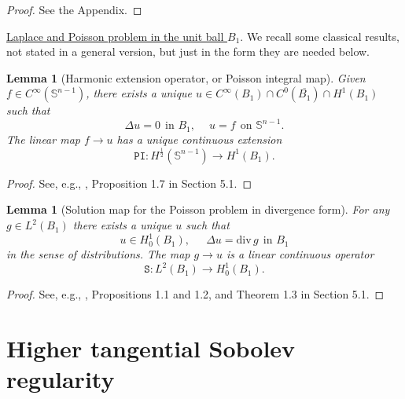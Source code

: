\documentclass[10pt,reqno,a4paper]{article}
\numberwithin{equation}{section}
\theoremstyle{plain}
\newtheorem{lemma}[theorem]{Lemma}
\theoremstyle{definition}
\renewcommand{\S}{{\mathbb S}}
\renewcommand{\div}{\mathrm{div}\,}
\begin{document}
\begin{proof}
See the Appendix.
\end{proof}




\medskip

\underline{Laplace and Poisson problem in the unit ball $B_1$}. 
We recall some classical results, not stated in a general version, 
but just in the form they are needed below. 

\begin{lemma}[Harmonic extension operator, or Poisson integral map] 
\label{lemma:def.harmonic.ext.op} 
Given $f \in C^\infty(\S^{n-1})$, there exists a unique 
$u \in C^\infty(B_1) \cap C^0(\overline{B_1}) \cap H^1(B_1)$ 
such that 
\[
\Delta u = 0 \ \  \text{in } B_1, \quad \ 
u = f \ \  \text{on } \S^{n-1}.
\]
The linear map $f \to u$ has a unique continuous extension 
\[
\mathtt{PI} : H^{\frac12}(\S^{n-1}) \to H^1(B_1).
\]
\end{lemma}

\begin{proof} 
See, e.g., \cite{Taylor.volume.1}, Proposition 1.7 in Section 5.1. 
\end{proof}


\begin{lemma}[Solution map for the Poisson problem in divergence form] 
\label{lemma:op.S}
For any $g \in L^2(B_1)$ there exists a unique $u$ such that 
\[
u \in H^1_0(B_1), \quad \ \  
\Delta u = \div g \ \  \text{in } B_1
\]
in the sense of distributions. 
The map $g \to u$ is a linear continuous operator 
\[
\mathtt S : L^2(B_1) \to H^1_0(B_1).
\]
\end{lemma}

\begin{proof} 
See, e.g., \cite{Taylor.volume.1}, 
Propositions 1.1 and 1.2, and Theorem 1.3 in Section 5.1. 
\end{proof}






\section{Higher tangential Sobolev regularity}
\label{sec:higher}
\end{document}
